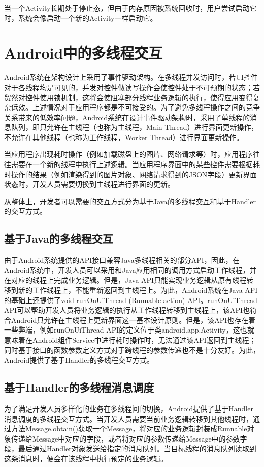 当一个Activity长期处于停止态，但由于内存原因被系统回收时，用户尝试启动它时，系统会像启动一个新的Activity一样启动它。

\section{Android中的多线程交互}
Android系统在架构设计上采用了事件驱动架构。在多线程并发访问时，若UI控件对于各线程均是可见的，并发对控件做读写操作会使控件处于不可预期的状态；若贸然对控件使用锁机制，这将会使阻塞部分线程业务逻辑的执行，使得应用变得复杂低效。上述情况对于应用程序都是不可接受的。为了避免多线程操作之间的竞争关系带来的低效率问题，Android系统在设计事件驱动架构时，采用了单线程的消息队列，即只允许在主线程（也称为主线程，Main Thread）进行界面更新操作，不允许在其他线程（也称为工作线程，Worker Thread）进行界面更新操作。

当应用程序出现耗时操作（例如加载磁盘上的图片、网络请求等）时，应用程序往往需要在一个新的线程中执行上述逻辑。当应用程序界面中的某些控件需要根据耗时操作的结果（例如渲染得到的图片对象、网络请求得到的JSON字段）更新界面状态时，开发人员需要切换到主线程进行界面的更新。

从整体上，开发者可以需要的交互方式分为基于Java的多线程交互和基于Handler的交互方式。

\subsection{基于Java的多线程交互}

由于Android系统提供的API接口兼容Java多线程相关的部分API，因此，在Android系统中，开发人员可以采用和Java应用相同的调用方式启动工作线程，并在对应的线程上完成业务逻辑。但是，Java API只能实现业务逻辑从原有线程转移到新的工作线程上，不能重新返回到主线程上。为此，Android系统在Java API的基础上还提供了void runOnUiThread (Runnable action) API。runOnUiThread API可以帮助开发人员将业务逻辑的执行从工作线程转移到主线程上，该API也符合Android只允许在主线程上更新界面这一基本设计原则。但是，该API也存在着一些弊端，例如runOnUiThread API的定义位于类android.app.Activity，这也就意味着在Android组件Service中进行耗时操作时，无法通过该API返回到主线程；同时基于接口的函数参数定义方式对于跨线程的参数传递也不是十分友好。为此，Android提供了基于Handler的多线程交互方式。

\subsection{基于Handler的多线程消息调度}

为了满足开发人员多样化的业务在多线程间的切换，Android提供了基于Handler消息调度的多线程交互方式。当开发人员需要当前业务逻辑转移到其他线程时，通过方法Message.obtain()获取一个Message，将对应的业务逻辑封装成Runnable对象传递给Message中对应的字段，或者将对应的参数传递给Message中的参数字段，最后通过Handler对象发送给指定的消息队列。当目标线程的消息队列读取到这条消息时，便会在该线程中执行预定的业务逻辑。

